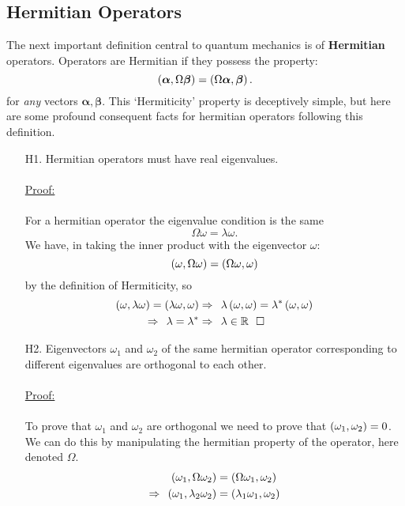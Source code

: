 \subsection{Hermitian Operators}
The next important definition central to quantum mechanics is of \textbf{Hermitian} operators. Operators are Hermitian if they possess the property:
$$
\oip{\bm{\alpha}}{\Omega\bm{\beta}}=\oip{\Omega\bm{\alpha}}{\bm{\beta}}.
$$
for \textit{any} vectors $\bm{\alpha},\bm{\beta}$. This `Hermiticity' property is deceptively simple, but here are some profound consequent facts for hermitian operators following this definition.
\begin{enumerate}
    \item[H1.] Hermitian operators must have real eigenvalues. \\\\
    \underline{Proof:}\\\\
    For a hermitian operator the eigenvalue condition is the same
    $$
    \Omega \omega= \lambda \omega.
    $$
    We have, in taking the inner product with the eigenvector $\omega$:
    $$
    \oip{\omega}{\Omega\omega}=\oip{\Omega\omega}{\omega} 
    $$
    by the definition of Hermiticity, so
    $$
    \begin{aligned}
    \oip{\omega}{\lambda\omega}=\oip{\lambda\omega}{\omega} &\Rightarrow\:\: \lambda\oip{\omega}{\omega} = \lambda^{\ast}\oip{\omega}{\omega}\\
    \Rightarrow\:\: \lambda = \lambda^{\ast} &\Rightarrow \:\: \lambda \in \mathbb{R} \btab \square
    \end{aligned}
    $$
    \item[H2.] Eigenvectors $\omega_{1}$ and $\omega_{2}$ of the same hermitian operator corresponding to different eigenvalues are orthogonal to each other.\\\\
    \underline{Proof:}\\\\
    To prove that $\omega_{1}$ and $\omega_{2}$ are orthogonal we need to prove that $\oip{\omega_{1}}{\omega_{2}}=0$. We can do this by manipulating the hermitian property of the operator, here denoted $\Omega$.
    $$
    \begin{aligned}
    \oip{\omega_{1}}{\Omega\omega_{2}}&=\oip{\Omega\omega_{1}}{\omega_{2}}\\
    \Rightarrow\:\: \oip{\omega_{1}}{\lambda_{2}\omega_{2}}&=\oip{\lambda_{1}\omega_{1}}{\omega_{2}}\\

\end{aligned}$$
\end{enumerate}
